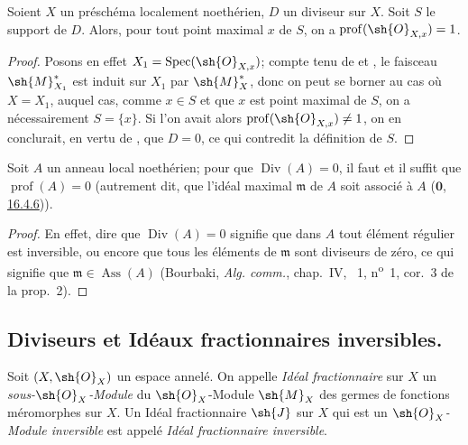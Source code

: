 \begin{corollary}[21.1.9]
\label{IV.21.1.9}
Soient $X$ un préschéma localement noethérien, $D$ un diviseur sur $X$.
Soit $S$ le support de $D$.
Alors, pour tout point maximal $x$ de $S$, on a $\operatorname{prof}(\sh{O}_{X,x})=1$.
\end{corollary}

\begin{proof}
Posons en effet $X_1=\operatorname{Spec}(\sh{O}_{X,x})$;
compte tenu de  et , le faisceau $\sh{M}_{X_1}^*$ est induit sur $X_1$ par $\sh{M}_X^*$, donc on peut se borner au cas où $X=X_1$, auquel cas, comme $x\in S$ et que $x$ est point maximal de $S$, on a nécessairement $S=\{x\}$.
Si l'on avait alors $\operatorname{prof}(\sh{O}_{X,x})\neq1$, on en conclurait, en vertu de , que $D=0$, ce qui contredit la définition de $S$.
\end{proof}

\begin{proposition}[21.1.10]
\label{IV.21.1.10}
Soit $A$ un anneau local noethérien;
pour que $\operatorname{Div}(A)=0$, il faut et il suffit que $\operatorname{prof}(A)=0$ (autrement dit, que l'idéal maximal $\mathfrak{m}$ de $A$ soit associé à $A$ \textup{(\hyperref[0.16.4.6]{$\mathbf{0}$, 16.4.6}))}.
\end{proposition}

\begin{proof}
En effet, dire que $\operatorname{Div}(A)=0$ signifie que dans $A$ tout élément régulier est inversible, ou encore que tous les éléments de $\mathfrak{m}$ sont diviseurs de zéro, ce qui signifie que $\mathfrak{m}\in\operatorname{Ass}(A)$ (Bourbaki, \emph{Alg. comm.}, chap.~IV, \textsection~1, n\textsuperscript{o}~1, cor.~3 de la prop.~2).
\end{proof}

\subsection{Diviseurs et Idéaux fractionnaires inversibles.}

\begin{env}[21.2.1]
Soit $(X,\sh{O}_X)$ un espace annelé.
On appelle \emph{Idéal fractionnaire} sur $X$ un \emph{sous-$\sh{O}_X$-Module} du $\sh{O}_X$-Module $\sh{M}_X$ des germes de fonctions méromorphes sur $X$.
Un Idéal fractionnaire $\sh{J}$ sur $X$ qui est un \emph{$\sh{O}_X$-Module inversible} est appelé \emph{Idéal fractionnaire inversible}.
\end{env}

